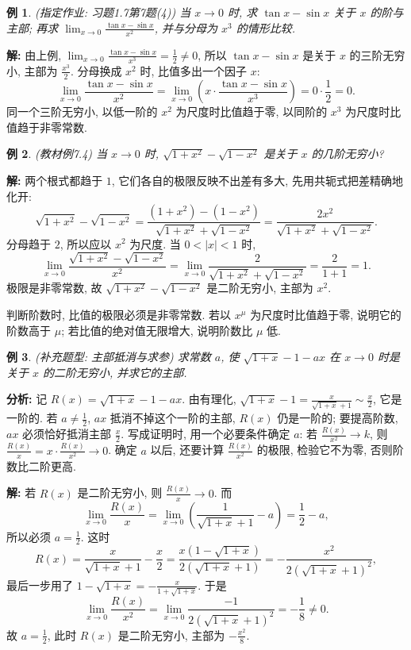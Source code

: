 \documentclass[UTF8,openany]{ctexbook}
\theoremstyle{chinesetextbook}
\newtheorem{example}{例}[section]
\newenvironment{cnsolution}{\par\indent\textbf{解:} \ignorespaces}{\par}
\begin{document}
\begin{example}
\textnormal{(指定作业: 习题1.7第7题(4))} 当 $x\to0$ 时, 求 $\tan x-\sin x$ 关于 $x$ 的阶与主部; 再求 $\displaystyle\lim_{x\to0}\frac{\tan x-\sin x}{x^2}$, 并与分母为 $x^3$ 的情形比较.
\end{example}
\begin{cnsolution}
由上例, $\displaystyle\lim_{x\to0}\frac{\tan x-\sin x}{x^3}=\frac12\ne0$, 所以 $\tan x-\sin x$ 是关于 $x$ 的三阶无穷小, 主部为 $\displaystyle\frac{x^3}2$. 分母换成 $x^2$ 时, 比值多出一个因子 $x$:
\[
\lim_{x\to0}\frac{\tan x-\sin x}{x^2}=\lim_{x\to0}\left(x\cdot\frac{\tan x-\sin x}{x^3}\right)=0\cdot\frac12=0.
\]
同一个三阶无穷小, 以低一阶的 $x^2$ 为尺度时比值趋于零, 以同阶的 $x^3$ 为尺度时比值趋于非零常数.
\end{cnsolution}
\begin{example}
\textnormal{(教材例7.4)} 当 $x\to0$ 时, $\sqrt{1+x^2}-\sqrt{1-x^2}$ 是关于 $x$ 的几阶无穷小?
\end{example}
\begin{cnsolution}
两个根式都趋于 $1$, 它们各自的极限反映不出差有多大, 先用共轭式把差精确地化开:
\[
\sqrt{1+x^2}-\sqrt{1-x^2}=\frac{(1+x^2)-(1-x^2)}{\sqrt{1+x^2}+\sqrt{1-x^2}}=\frac{2x^2}{\sqrt{1+x^2}+\sqrt{1-x^2}}.
\]
分母趋于 $2$, 所以应以 $x^2$ 为尺度. 当 $0<|x|<1$ 时,
\[
\lim_{x\to0}\frac{\sqrt{1+x^2}-\sqrt{1-x^2}}{x^2}=\lim_{x\to0}\frac2{\sqrt{1+x^2}+\sqrt{1-x^2}}=\frac2{1+1}=1.
\]
极限是非零常数, 故 $\sqrt{1+x^2}-\sqrt{1-x^2}$ 是二阶无穷小, 主部为 $x^2$.
\end{cnsolution}
判断阶数时, 比值的极限必须是非零常数. 若以 $x^\mu$ 为尺度时比值趋于零, 说明它的阶数高于 $\mu$; 若比值的绝对值无限增大, 说明阶数比 $\mu$ 低.
\begin{example}
\textnormal{(补充题型: 主部抵消与求参)} 求常数 $a$, 使 $\sqrt{1+x}-1-ax$ 在 $x\to0$ 时是关于 $x$ 的二阶无穷小, 并求它的主部.
\end{example}
\par\indent\textbf{分析:} 记 $R(x)=\sqrt{1+x}-1-ax$. 由有理化, $\displaystyle\sqrt{1+x}-1=\frac x{\sqrt{1+x}+1}\sim\frac x2$, 它是一阶的. 若 $\displaystyle a\ne\frac12$, $ax$ 抵消不掉这个一阶的主部, $R(x)$ 仍是一阶的; 要提高阶数, $ax$ 必须恰好抵消主部 $\displaystyle\frac x2$. 写成证明时, 用一个必要条件确定 $a$: 若 $\displaystyle\frac{R(x)}{x^2}\to k$, 则 $\displaystyle\frac{R(x)}x=x\cdot\frac{R(x)}{x^2}\to0$. 确定 $a$ 以后, 还要计算 $\displaystyle\frac{R(x)}{x^2}$ 的极限, 检验它不为零, 否则阶数比二阶更高.
\begin{cnsolution}
若 $R(x)$ 是二阶无穷小, 则 $\displaystyle\frac{R(x)}x\to0$. 而
\[
\lim_{x\to0}\frac{R(x)}x=\lim_{x\to0}\left(\frac1{\sqrt{1+x}+1}-a\right)=\frac12-a,
\]
所以必须 $\displaystyle a=\frac12$. 这时
\[
R(x)=\frac x{\sqrt{1+x}+1}-\frac x2=\frac{x\left(1-\sqrt{1+x}\right)}{2\left(\sqrt{1+x}+1\right)}=-\frac{x^2}{2\left(\sqrt{1+x}+1\right)^2},
\]
最后一步用了 $\displaystyle1-\sqrt{1+x}=-\frac x{1+\sqrt{1+x}}$. 于是
\[
\lim_{x\to0}\frac{R(x)}{x^2}=\lim_{x\to0}\frac{-1}{2\left(\sqrt{1+x}+1\right)^2}=-\frac18\ne0.
\]
故 $\displaystyle a=\frac12$, 此时 $R(x)$ 是二阶无穷小, 主部为 $\displaystyle-\frac{x^2}8$.
\end{cnsolution}
\end{document}
